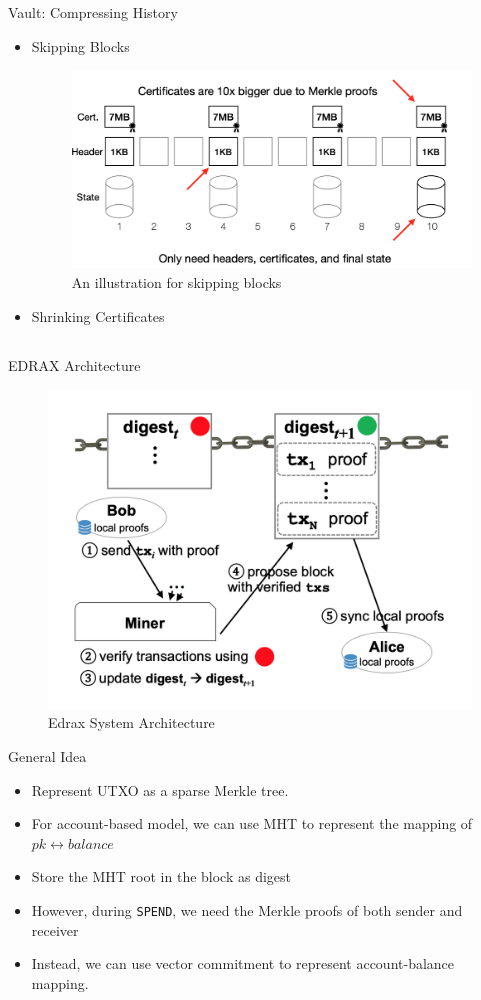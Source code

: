 \documentclass[biblatex,aspectratio=169,11pt]{mybeamer}
\begin{document}
\begin{frame}{Vault: Compressing History}
  \begin{itemize}[<+->]
    \item Skipping Blocks
    \begin{figure}
      \includegraphics[width=0.5\linewidth]{figs/skip-block.png}
      \caption{An illustration for skipping blocks}
    \end{figure}
    \item Shrinking Certificates
  \end{itemize}
\end{frame}

\subsection{}

\begin{frame}{EDRAX Architecture}
  \begin{figure}
    \includegraphics[width=0.6\linewidth]{figs/Edrax-arch.png}
    \caption{Edrax System Architecture}
  \end{figure}
\end{frame}

\begin{frame}{General Idea}
  \begin{itemize}[<+->]
    \item Represent UTXO as a sparse Merkle tree.
    \item For account-based model, we can use MHT to represent the mapping of $pk \leftrightarrow balance$
    \item Store the MHT root in the block as digest
    \item However, during \texttt{SPEND}, we need the Merkle proofs of both sender and receiver
    \item Instead, we can use \alert{vector commitment} to represent account-balance mapping.
  \end{itemize}
\end{frame}
\end{document}
